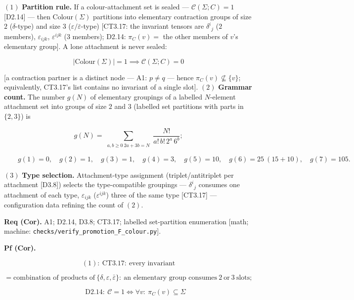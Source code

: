 \begin{corollary}\label{tag:CT3-17a}
$(1)$ \textbf{Partition rule.} If a colour-attachment set is sealed — $\mathcal C(\Sigma;C)=1$ [D2.14] — then $\mathrm{Colour}(\Sigma)$ partitions into elementary contraction groups of size $2$ ($\delta$-type) and size $3$ ($\varepsilon/\bar\varepsilon$-type) [CT3.17: the invariant tensors are $\delta^{i}{}_{j}$ ($2$ members), $\varepsilon_{ijk}$, $\varepsilon^{ijk}$ ($3$ members); D2.14: $\pi_C(v)=$ the other members of $v$'s elementary group]. A lone attachment is never sealed:

\[
|\mathrm{Colour}(\Sigma)|=1\implies\mathcal C(\Sigma;C)=0
\]

[a contraction partner is a distinct node — A1: $p\ne q$ — hence $\pi_C(v)\not\subseteq\{v\}$; equivalently, CT3.17's list contains no invariant of a single slot]. $(2)$ \textbf{Grammar count.} The number $g(N)$ of elementary groupings of a labelled $N$-element attachment set into groups of size $2$ and $3$ (labelled set partitions with parts in $\{2,3\}$) is

\[
g(N)=\!\!\sum_{\substack{a,b\ge0\  2a+3b=N}}\!\!\frac{N!}{a!\,b!\,2^{a}\,6^{b}};
\]

\[
\qquad g(1)=0,\quad g(2)=1,\quad g(3)=1,\quad g(4)=3,\quad g(5)=10,\quad g(6)=25\ (15+10),\quad g(7)=105 .
\]

$(3)$ \textbf{Type selection.} Attachment-type assignment (triplet/antitriplet per attachment [D3.8]) selects the type-compatible groupings — $\delta^{i}{}_{j}$ consumes one attachment of each type, $\varepsilon_{ijk}$ ($\varepsilon^{ijk}$) three of the same type [CT3.17] — configuration data refining the count of $(2)$.

\textbf{Req (Cor).} A1; D2.14, D3.8; CT3.17; labelled set-partition enumeration [math; machine: \texttt{checks/\allowbreak{}verify\_\allowbreak{}promotion\_\allowbreak{}F\_\allowbreak{}colour.py}].

\textbf{Pf (Cor).}

\[
(1):\ \mathrm{CT3.17}:\ \text{every invariant}
\]

\[
= \text{combination of products of}\ \{\delta,\varepsilon,\bar\varepsilon\}:\ \text{an elementary group consumes}\ 2\ \text{or}\ 3\ \text{slots};
\]

\[
\qquad \mathrm{D2.14}:\ \mathcal C=1\iff\forall v:\ \pi_C(v)\subseteq\Sigma
\]


\end{corollary}
